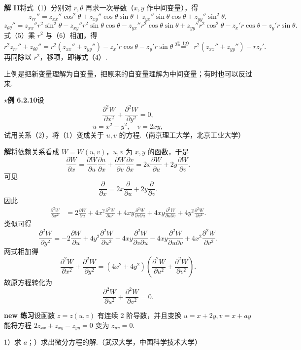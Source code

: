 \documentclass[UTF8, 12pt, fontset=fandol, oneside]{ctexart}
\begin{document}
\noindent\textbf{解 II}\quad 将式（1）分别对 $r,\theta$ 再求一次导数（$x,y$ 作中间变量），得
\[
  z_{rr}''=z_{xx}''\cos^2\theta+z_{xy}''\cos\theta\sin\theta+z_{yx}''\sin\theta\cos\theta+z_{yy}''\sin^2\theta, \tag{5}
\]
\[
  z_{\theta\theta}''=z_{xx}''r^2\sin^2\theta-z_{xy}''r^2\sin\theta\cos\theta
  -z_{yx}''r^2\cos\theta\sin\theta+z_{yy}''r^2\cos^2\theta-z_x'r\cos\theta-z_y'r\sin\theta. \tag{6}
\]
式（5）乘 $r^2$ 与（6）相加，得
\[
  r^2z_{rr}''+z_{\theta\theta}''
  =r^2(z_{xx}''+z_{yy}'')-z_x'r\cos\theta-z_y'r\sin\theta
  \stackrel{\text{式（2）}}{=}r^2(z_{xx}''+z_{yy}'')-rz_r'.
\]
再同除以 $r^2$，移项，即得式（4）.

上例是把新变量理解为自变量，把原来的自变量理解为中间变量；有时也可以反过来.

\noindent\textbf{\ensuremath{\star}例 6.2.10}\quad 设
\[
  \frac{\partial^2W}{\partial x^2}+\frac{\partial^2W}{\partial y^2}=0, \tag{1}
\]
\[
  u=x^2-y^2,\quad v=2xy, \tag{2}
\]
试用关系（2），将（1）变成关于 $u,v$ 的方程.（南京理工大学，北京工业大学）

\noindent\textbf{解}\quad 将依赖关系看成 $W=W(u,v)$，$u,v$ 为 $x,y$ 的函数，于是
\[
  \frac{\partial W}{\partial x}
  =\frac{\partial W}{\partial u}\frac{\partial u}{\partial x}
  +\frac{\partial W}{\partial v}\frac{\partial v}{\partial x}
  =2x\frac{\partial W}{\partial u}+2y\frac{\partial W}{\partial v}.
\]
可见
\[
  \frac{\partial}{\partial x}=2x\frac{\partial}{\partial u}+2y\frac{\partial}{\partial v}.
\]
因此
\[
\begin{aligned}
\frac{\partial^2W}{\partial x^2}
&=2\frac{\partial W}{\partial u}+4x^2\frac{\partial^2W}{\partial u^2}
+4xy\frac{\partial^2W}{\partial v\partial u}
+4xy\frac{\partial^2W}{\partial u\partial v}
+4y^2\frac{\partial^2W}{\partial v^2}.
\end{aligned}
\]
类似可得
\[
  \frac{\partial^2W}{\partial y^2}
  =-2\frac{\partial W}{\partial u}+4y^2\frac{\partial^2W}{\partial u^2}
  -4xy\frac{\partial^2W}{\partial v\partial u}
  -4xy\frac{\partial^2W}{\partial u\partial v}
  +4x^2\frac{\partial^2W}{\partial v^2}.
\]
两式相加得
\[
  \frac{\partial^2W}{\partial x^2}+\frac{\partial^2W}{\partial y^2}
  =(4x^2+4y^2)\left(\frac{\partial^2W}{\partial u^2}+\frac{\partial^2W}{\partial v^2}\right).
\]
故原方程转化为
\[
  \frac{\partial^2W}{\partial u^2}+\frac{\partial^2W}{\partial v^2}=0.
\]

\noindent\textbf{new 练习}\quad 设函数 $z=z(u,v)$ 有连续 2 阶导数，并且变换 $u=x+2y,v=x+ay$ 能将方程 $2z_{xx}+z_{xy}-z_{yy}=0$ 变为 $z_{uv}=0$.

1）求 $a$；）求出微分方程的解.（武汉大学，中国科学技术大学）
\end{document}
